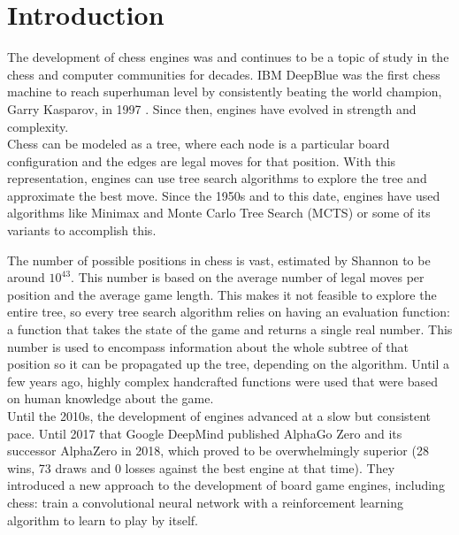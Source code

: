 \section{Introduction}



The development of chess engines was and continues to be a topic of study in the chess and computer communities for decades. IBM DeepBlue \cite{deepblue:2002} was the first chess machine to reach superhuman level by consistently beating the world champion, Garry Kasparov, in 1997 \cite{washingtonpost:1997}. Since then, engines have evolved in strength and complexity. \\

Chess can be modeled as a tree, where each node is a particular board configuration and the edges are legal moves for that position. With this representation, engines can use tree search algorithms to explore the tree and approximate the best move. Since the 1950s and to this date, engines have used algorithms like Minimax \cite{minimax-survey:1995} and Monte Carlo Tree Search \cite{mcts-survey:2012} (MCTS) or some of its variants \cite{tree-search-methods:2014,mcts-modifications:2022} to accomplish this.

The number of possible positions in chess is vast, estimated by Shannon \cite{shannon:1950} to be around $10^{43}$. This number is based on the average number of legal moves per position and the average game length. This makes it not feasible to explore the entire tree, so every tree search algorithm relies on having an evaluation function: a function that takes the state of the game and returns a single real number. This number is used to encompass information about the whole subtree of that position so it can be propagated up the tree, depending on the algorithm. Until a few years ago, highly complex handcrafted functions were used that were based on human knowledge about the game. \\

Until the 2010s, the development of engines advanced at a slow but consistent pace. Until 2017 that Google DeepMind published AlphaGo Zero \cite{alphagozero:2017} and its successor AlphaZero \cite{alphazero:2017,alphazero:2018} in 2018, which proved to be overwhelmingly superior (28 wins, 73 draws and 0 losses against the best engine at that time). They introduced a new approach to the development of board game engines, including chess: train a convolutional neural network with a reinforcement learning algorithm to learn to play by itself.

